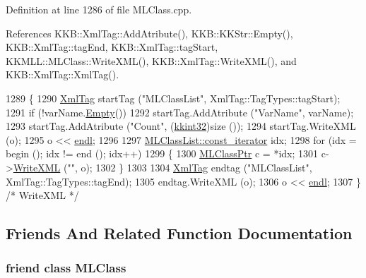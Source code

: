 Definition at line 1286 of file M\+L\+Class.\+cpp.



References K\+K\+B\+::\+Xml\+Tag\+::\+Add\+Atribute(), K\+K\+B\+::\+K\+K\+Str\+::\+Empty(), K\+K\+B\+::\+Xml\+Tag\+::tag\+End, K\+K\+B\+::\+Xml\+Tag\+::tag\+Start, K\+K\+M\+L\+L\+::\+M\+L\+Class\+::\+Write\+X\+M\+L(), K\+K\+B\+::\+Xml\+Tag\+::\+Write\+X\+M\+L(), and K\+K\+B\+::\+Xml\+Tag\+::\+Xml\+Tag().


\begin{DoxyCode}
1289 \{
1290   \hyperlink{class_k_k_b_1_1_xml_tag}{XmlTag} startTag (\textcolor{stringliteral}{"MLClassList"}, XmlTag::TagTypes::tagStart);
1291   \textcolor{keywordflow}{if}  (!varName.\hyperlink{class_k_k_b_1_1_k_k_str_ac69942f73fffd672ec2a6e1c410afdb6}{Empty}())
1292     startTag.AddAtribute (\textcolor{stringliteral}{"VarName"}, varName);
1293   startTag.AddAtribute (\textcolor{stringliteral}{"Count"}, (\hyperlink{namespace_k_k_b_a8fa4952cc84fda1de4bec1fbdd8d5b1b}{kkint32})size ());
1294   startTag.WriteXML (o);
1295   o << \hyperlink{namespace_k_k_b_ad1f50f65af6adc8fa9e6f62d007818a8}{endl};
1296 
1297   \hyperlink{class_k_k_b_1_1_k_k_queue_aeb057c9c010446f46f57c1e355f981f1}{MLClassList::const\_iterator}  idx;
1298   \textcolor{keywordflow}{for}  (idx = begin ();  idx != end ();  idx++)
1299   \{
1300     \hyperlink{class_k_k_m_l_l_1_1_m_l_class}{MLClassPtr}  c = *idx;
1301     c->\hyperlink{class_k_k_m_l_l_1_1_m_l_class_a3ba7c0c32b973c8cd0231d7ef8f7e122}{WriteXML} (\textcolor{stringliteral}{""}, o);
1302   \}
1303 
1304   \hyperlink{class_k_k_b_1_1_xml_tag}{XmlTag}  endtag (\textcolor{stringliteral}{"MLClassList"}, XmlTag::TagTypes::tagEnd);
1305   endtag.WriteXML (o);
1306   o << \hyperlink{namespace_k_k_b_ad1f50f65af6adc8fa9e6f62d007818a8}{endl};
1307 \}  \textcolor{comment}{/* WriteXML */}
\end{DoxyCode}


\subsection{Friends And Related Function Documentation}
\subsubsection[{\texorpdfstring{M\+L\+Class}{MLClass}}]{\setlength{\rightskip}{0pt plus 5cm}friend class {\bf M\+L\+Class}\hspace{0.3cm}{\ttfamily [friend]}}\hypertarget{class_k_k_m_l_l_1_1_m_l_class_list_a667e4e193073b2d585bbbc4b10881d91}{}\label{class_k_k_m_l_l_1_1_m_l_class_list_a667e4e193073b2d585bbbc4b10881d91}


